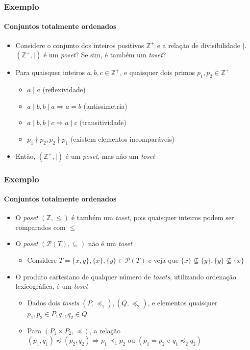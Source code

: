 \documentclass[12pt]{beamer}
\begin{document}
\begin{frame}
  \frametitle{Exemplo}
  \framesubtitle{Conjuntos totalmente ordenados}
  \begin{itemize}
    \item Considere o conjunto dos inteiros positivos $\mathbb{Z}^{+}$ e a
        relação de divisibilidade $\mid$. $(\mathbb{Z}^{+}, \mid)$ é um
          \emph{poset}? Se sim, é também um \emph{toset}?
    \item Para quaisquer inteiros $a, b, c \in \mathbb{Z}^{+}$, e quaisquer
        dois primos $p_1, p_2 \in \mathbb{Z}^{+}$
    \begin{itemize}[itemsep=0pt]
      \item $a \mid a$ (reflexividade)
      \item $a \mid b, b \mid a \Rightarrow a = b$ (antissimetria)
      \item $a \mid b, b \mid c \Rightarrow a \mid c$ (transitividade)
      \item $p_1 \nmid p_2, p_2 \nmid p_1$ (existem elementos incomparáveis)
    \end{itemize}
    \item Então, $(\mathbb{Z}^{+}, \mid)$ é um \emph{poset}, mas não um
        \emph{toset}
  \end{itemize}
\end{frame}

\begin{frame}
  \frametitle{Exemplo}
  \framesubtitle{Conjuntos totalmente ordenados}
  \begin{itemize}
    \item O \emph{poset} $(\mathbb{Z}, \leq)$ é também um \emph{toset}, pois
        quaisquer inteiros podem ser comparados com $\leq$
    \item O \emph{poset} $(\mathcal{P}(T), \subseteq)$ não é um \emph{toset}
    \begin{itemize}
      \item Considere $T = \{x, y\}, \{x\}, \{y\} \in \mathcal{P}(T)$ e veja
          que $\{x\} \not\subseteq \{y\}, \{y\} \not\subseteq \{x\}$
    \end{itemize}
    \item O produto cartesiano de qualquer número de \emph{tosets}, utilizando
        ordenação lexicográfica, é um \emph{toset}
    \begin{itemize}[itemsep=0pt]
      \item Dados dois \emph{tosets} $(P, \preccurlyeq_1), (Q,
          \preccurlyeq_2)$, e elementos quaisquer $p_1, p_2 \in P, q_1, q_2 \in
            Q$
      \item Para $(P_1 \times P_2, \preccurlyeq)$, a relação $(p_1, q_1)
          \preccurlyeq (p_2, q_2) \Rightarrow p_1 \prec_1 p_2 \text{ ou } (p_1
            = p_2 \text{ e } q_1 \preccurlyeq_2 q_2)$
    \end{itemize}
  \end{itemize}
\end{frame}
\end{document}
